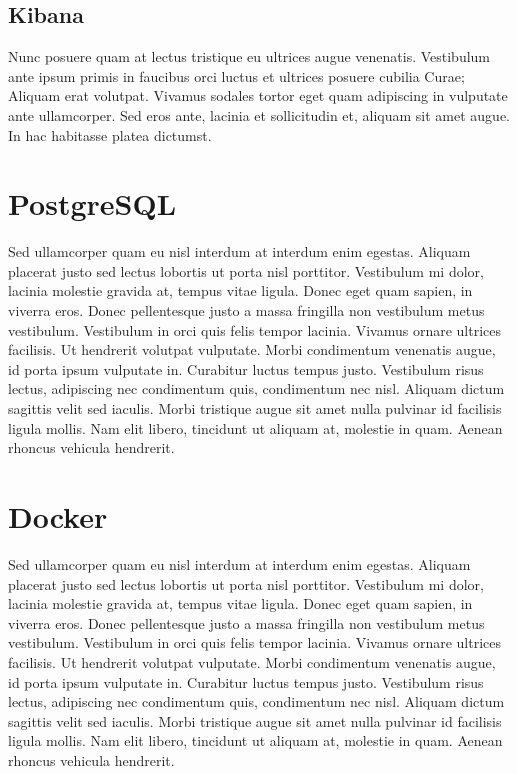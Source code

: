 \subsection{Kibana}

Nunc posuere quam at lectus tristique eu ultrices augue venenatis. Vestibulum ante ipsum primis in faucibus orci luctus et ultrices posuere cubilia Curae; Aliquam erat volutpat. Vivamus sodales tortor eget quam adipiscing in vulputate ante ullamcorper. Sed eros ante, lacinia et sollicitudin et, aliquam sit amet augue. In hac habitasse platea dictumst.


\section{PostgreSQL}

Sed ullamcorper quam eu nisl interdum at interdum enim egestas. Aliquam placerat justo sed lectus lobortis ut porta nisl porttitor. Vestibulum mi dolor, lacinia molestie gravida at, tempus vitae ligula. Donec eget quam sapien, in viverra eros. Donec pellentesque justo a massa fringilla non vestibulum metus vestibulum. Vestibulum in orci quis felis tempor lacinia. Vivamus ornare ultrices facilisis. Ut hendrerit volutpat vulputate. Morbi condimentum venenatis augue, id porta ipsum vulputate in. Curabitur luctus tempus justo. Vestibulum risus lectus, adipiscing nec condimentum quis, condimentum nec nisl. Aliquam dictum sagittis velit sed iaculis. Morbi tristique augue sit amet nulla pulvinar id facilisis ligula mollis. Nam elit libero, tincidunt ut aliquam at, molestie in quam. Aenean rhoncus vehicula hendrerit.


\section{Docker}

Sed ullamcorper quam eu nisl interdum at interdum enim egestas. Aliquam placerat justo sed lectus lobortis ut porta nisl porttitor. Vestibulum mi dolor, lacinia molestie gravida at, tempus vitae ligula. Donec eget quam sapien, in viverra eros. Donec pellentesque justo a massa fringilla non vestibulum metus vestibulum. Vestibulum in orci quis felis tempor lacinia. Vivamus ornare ultrices facilisis. Ut hendrerit volutpat vulputate. Morbi condimentum venenatis augue, id porta ipsum vulputate in. Curabitur luctus tempus justo. Vestibulum risus lectus, adipiscing nec condimentum quis, condimentum nec nisl. Aliquam dictum sagittis velit sed iaculis. Morbi tristique augue sit amet nulla pulvinar id facilisis ligula mollis. Nam elit libero, tincidunt ut aliquam at, molestie in quam. Aenean rhoncus vehicula hendrerit.

